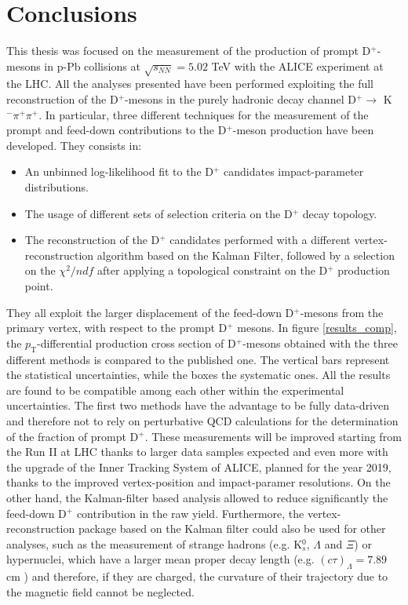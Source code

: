 \documentclass[b5paper,10pt,twoside,oldstyle,classica]{toptesi}
\newcommand{\pt}{p_\text{T}}
\begin{document}
\chapter{Conclusions}
This thesis was focused on the measurement of the production of prompt D$^+$-mesons in p-Pb collisions at $\sqrt{s_{NN}}=5.02$ TeV with the ALICE experiment at the LHC. All the analyses presented have been performed exploiting the full reconstruction of the D$^+$-mesons in the purely hadronic decay channel D$^+\rightarrow$ K$^-\pi^+\pi^+$. In particular, three different techniques for the measurement of the prompt and feed-down contributions to the D$^+$-meson production have been developed. They consists in:  
\begin{itemize}
 \item An unbinned log-likelihood fit to the D$^+$ candidates impact-parameter distributions.
 \item The usage of different sets of selection criteria on the D$^+$ decay topology.
 \item The reconstruction of the D$^+$ candidates performed with a different vertex-reconstruction algorithm based on the Kalman Filter, followed by a selection on the $\chi^2/ndf$ after applying a topological constraint on the D$^+$ production point.  
\end{itemize}
They all exploit the larger displacement of the feed-down D$^+$-mesons from the primary vertex, with respect to the prompt D$^+$ mesons.
In figure \ref{results_comp}, the $\pt$-differential production cross section of D$^+$-mesons obtained with the three different methods is compared to the published one. The vertical bars represent the statistical uncertainties, while the boxes the systematic ones. All the results are found to be compatible among each other within the experimental uncertainties. The first two methods have the advantage to be fully data-driven and therefore not to rely on perturbative QCD calculations for the determination of the fraction of prompt D$^+$. These measurements will be improved starting from the Run II at LHC thanks to larger data samples expected and even more with the upgrade of the Inner Tracking System of ALICE, planned for the year 2019, thanks to the improved vertex-position and impact-paramer resolutions. On the other hand, the Kalman-filter based analysis allowed to reduce significantly the feed-down D$^+$ contribution in the raw yield. Furthermore, the vertex-reconstruction package based on the Kalman filter could also be used for other analyses, such as the measurement of strange hadrons (e.g. K$_s^0$, $\Lambda$ and $\Xi$) or hypernuclei, which have a larger mean proper decay length (e.g. $(c\tau)_{\Lambda}=7.89$ cm \cite{Agashe:2014kda}) and therefore, if they are charged, the curvature of their trajectory due to the magnetic field cannot be neglected.  
\end{document}
